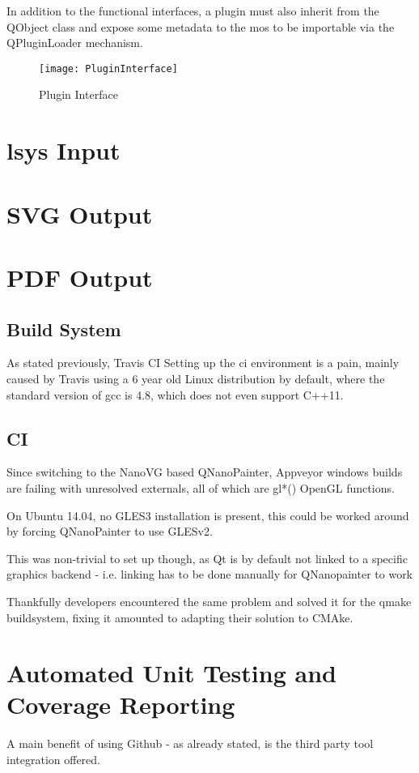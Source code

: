 In addition to the functional interfaces, a plugin must also inherit from the QObject class and expose some metadata to the \gls{mos} to be importable via the QPluginLoader mechanism.

\begin{figure}[htb]
	\texttt{[image: PluginInterface]}
	\caption{Plugin Interface}
	\label{fig:plugint}
\end{figure}

\section{\gls{lsys} Input}
\label{sec:lsys}
\section{SVG Output}
\label{sec:svg}

\section{PDF Output}
\label{sec:pdf}


\subsection{Build System}
As stated previously, Travis CI
Setting up the \gls{ci} environment is a pain, mainly caused by Travis using a 6 year old Linux distribution by default, where the standard version of gcc is 4.8, which does not even support C++11.

\subsection{CI}
Since switching to the NanoVG based QNanoPainter, Appveyor windows builds are failing with unresolved externals, all of which are gl*() OpenGL functions.


On Ubuntu 14.04, no GLES3 installation is present, this could be worked around by forcing QNanoPainter to use GLESv2.

This was non-trivial to set up though, as Qt is by default not linked to a specific graphics backend - i.e. linking has to be done manually for QNanopainter to work

Thankfully developers encountered the same problem and solved it for the qmake buildsystem, fixing it amounted to adapting their solution to CMAke.

\section{Automated Unit Testing and Coverage Reporting}
A main benefit of using Github - as already stated, is the third party tool integration offered.

